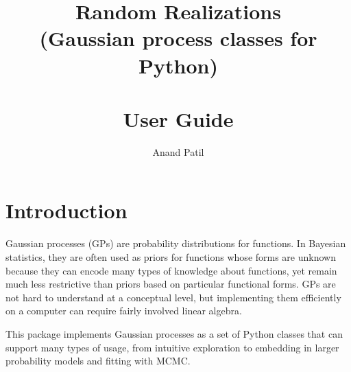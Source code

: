 \documentclass{manual}
\begin{document}
\title{Random Realizations\\
(Gaussian process classes for Python)\\\\
User Guide
}
\author{Anand Patil}
\maketitle
\tableofcontents

\chapter{Introduction}\label{cha:introduction} %

Gaussian processes (GPs) are probability distributions for functions. In Bayesian statistics, they are often used as priors for functions whose forms are unknown because they can encode many types of knowledge about functions, yet remain much less restrictive than priors based on particular functional forms. GPs are not hard to understand at a conceptual level, but implementing them efficiently on a computer can require fairly involved linear algebra.

This package implements Gaussian processes as a set of Python classes that can support many types of usage, from intuitive exploration to embedding in larger probability models and fitting with MCMC.
\end{document}
